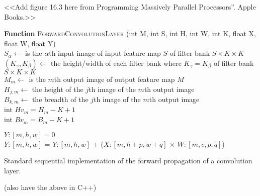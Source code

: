 \documentclass[7pt]{article}
\begin{document}
<<Add figure 16.3 here from Programming Massively Parallel Processors”. Apple Books.>>

\begin{algorithm}
\vspace{0.1in}
	{\textbf{Function} \textsc{ForwardConvolutionLayer} (int M, int S, int H, int W, int K, float X, float W, float Y)}\\
	\vspace{0.05in}
	 $S_{\alpha} \leftarrow$ is the $\alpha$th input image of input feature map $S$ of filter bank $S \times K \times K$\\
	  $(K_{\gamma}, K_{\beta})  \leftarrow$ the height/width of each filter bank where $K_{\gamma} = K_{\beta}$ of filter bank $S \times K \times K$\\
	 $M_m \leftarrow$ is the $m$th output image of output feature map $M$\\
	 $H_{j,m} \leftarrow$ the height of the $j$th image of the $m$th output image\\
	 $B_{k,m} \leftarrow$ the breadth of the $j$th image of the $m$th output image\\
	 	\vspace{0.05in}
	 int $Hv_{m} = H_{m} - K  + 1$ \\
	 int $Bv_{m} = B_{m} - K  + 1$

	\vspace{0.05in}
	{
				{
					{
						 {$Y : [m,h,w] = 0$} \\
						 {
						 	{
						 		{
						 			{$Y:[m,h,w]$} = {$Y:[m,h,w]$}  + ({$X:[m,h+p,w+q]$} $\times$  {$W:[m,c,p,q]$})
						 		}
						 	}
						 }
					}
				}
	}

	\caption{Standard sequential implementation of the forward propagation of a convolution layer.}
\end{algorithm}
(also have the above in C++)
\end{document}
